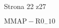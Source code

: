 \documentclass[a4paper,12pt]{article}
\begin{document}
Strona 22 z27

$\mathrm{M}\mathrm{M}\mathrm{A}\mathrm{P}-\mathrm{R}0_{-}10$
\end{document}
